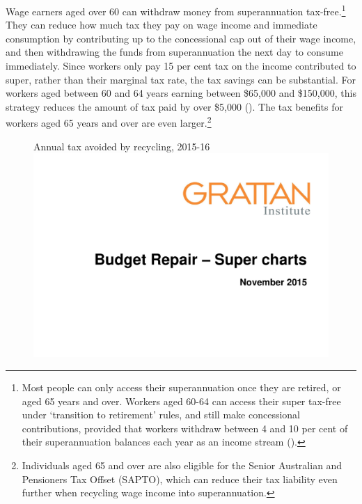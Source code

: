 \begin{subappendices}
Wage earners aged over 60 can withdraw money from superannuation tax-free.\footnote{Most people can only access their superannuation once they are retired, or aged 65 years and over. Workers aged 60-64 can access their super tax-free under ‘transition to retirement’ rules, and still make concessional contributions, provided that workers withdraw between 4 and 10 per cent of their superannuation balances each year as an income stream (\textcites[][143]{ProductivityCommission2015SuperPolicyPostRetirement}{ATO2015al}).}  They can reduce how much tax they pay on wage income and immediate consumption by contributing up to the concessional cap out of their wage income, and then withdrawing the funds from superannuation the next day to consume immediately. Since workers only pay 15 per cent tax on the income contributed to super, rather than their marginal tax rate, the tax savings can be substantial. For workers aged between 60 and 64 years earning between \$65,000 and \$150,000, this strategy reduces the amount of tax paid by over \$5,000 (). The tax benefits for workers aged 65 years and over are even larger.\footnote{Individuals aged 65 and over are also eligible for the Senior Australian and Pensioners Tax Offset (SAPTO), which can reduce their tax liability even further when recycling wage income into superannuation.}  

\begin{figure}
%
{Annual tax avoided by recycling, 2015-16}
\includegraphics[width=\columnwidth,page=49]{super-atlas/PPTX.pdf}


\end{figure}
\end{subappendices}
